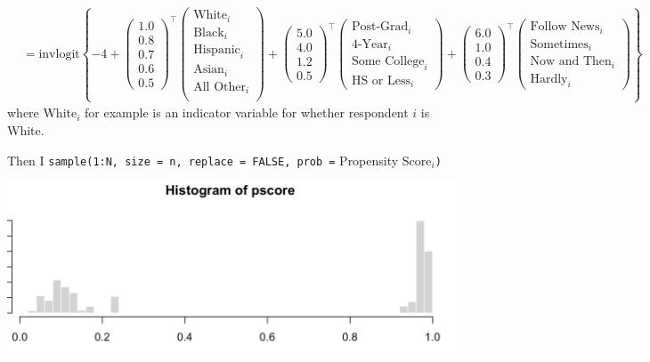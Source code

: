 \documentclass[ignorenonframetext, 10.5pt, aspectratio=169]{beamer}
\begin{document}
\begin{frame}
\footnotesize
\begin{align*}
&= \text{invlogit}\left\{-4 + \begin{pmatrix}1.0\\0.8 \\0.7\\ 0.6\\ 0.5\end{pmatrix}^\top\begin{pmatrix}\text{White}_i\\\text{Black}_i\\\text{Hispanic}_i\\\text{Asian}_i\\\text{All Other}_i\\\end{pmatrix} + 
\begin{pmatrix}5.0\\4.0\\1.2\\0.5\end{pmatrix}^\top\begin{pmatrix}\text{Post-Grad}_i\\\text{4-Year}_i\\\text{Some College}_i\\\text{HS or Less}_i\end{pmatrix}  + 
\begin{pmatrix}6.0\\1.0\\ 0.4\\ 0.3\end{pmatrix}^\top\begin{pmatrix}\text{Follow News}_i\\\text{Sometimes}_i\\\text{Now and Then}_i\\\text{Hardly}_i\end{pmatrix}\right\}
\end{align*}
where White$_{i}$ for example is an indicator variable for whether respondent \(i\) is White. 


\normalsize
Then I \texttt{sample(1:N, size = n, replace = FALSE, prob =} Propensity Score$_i$\texttt{)}

\end{frame}


\begin{frame}
\centering
\includegraphics[width = 0.8\linewidth]{pscore.png}
\end{frame}
\end{document}
